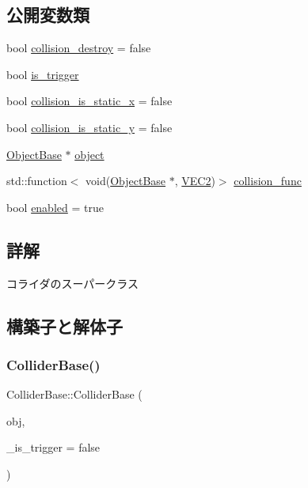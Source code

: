 \subsection*{公開変数類}
\begin{DoxyCompactItemize}
\item 
bool \mbox{\hyperlink{class_collider_base_a1943a8429f6ef2cce5785975cba321b1}{collision\+\_\+destroy}} = false
\item 
bool \mbox{\hyperlink{class_collider_base_a8e2383d9422880103aa5309a6dfcef48}{is\+\_\+trigger}}
\item 
bool \mbox{\hyperlink{class_collider_base_a7e6348c051a8c01ff7884d366bd292eb}{collision\+\_\+is\+\_\+static\+\_\+x}} = false
\item 
bool \mbox{\hyperlink{class_collider_base_a5a50a0f911a108eba730de1b22c1cc9e}{collision\+\_\+is\+\_\+static\+\_\+y}} = false
\item 
\mbox{\hyperlink{class_object_base}{Object\+Base}} $\ast$ \mbox{\hyperlink{class_collider_base_a63adac6a75877857abe9ff2cf4274157}{object}}
\item 
std\+::function$<$ void(\mbox{\hyperlink{class_object_base}{Object\+Base}} $\ast$, \mbox{\hyperlink{common_8h_afb0c5e21d4133ff4f200992c0b534e1b}{V\+E\+C2}})$>$ \mbox{\hyperlink{class_collider_base_a5ac4f3c76c753790abef75e3eb7accbe}{collision\+\_\+func}}
\item 
bool \mbox{\hyperlink{class_collider_base_a812053f247dc6357357bdf9353dded77}{enabled}} = true
\end{DoxyCompactItemize}


\subsection{詳解}
コライダのスーパークラス 

\subsection{構築子と解体子}
\mbox{\label{class_collider_base_a61d7057a7e05549088f2b15c1e525858}} 
\subsubsection{\texorpdfstring{Collider\+Base()}{ColliderBase()}}
{\footnotesize\ttfamily Collider\+Base\+::\+Collider\+Base (\begin{DoxyParamCaption}\item[{\mbox{\hyperlink{class_object_base}{Object\+Base}} $\ast$}]{obj,  }\item[{bool}]{\+\_\+is\+\_\+trigger = {\ttfamily false} }\end{DoxyParamCaption})\hspace{0.3cm}{\ttfamily [inline]}}



